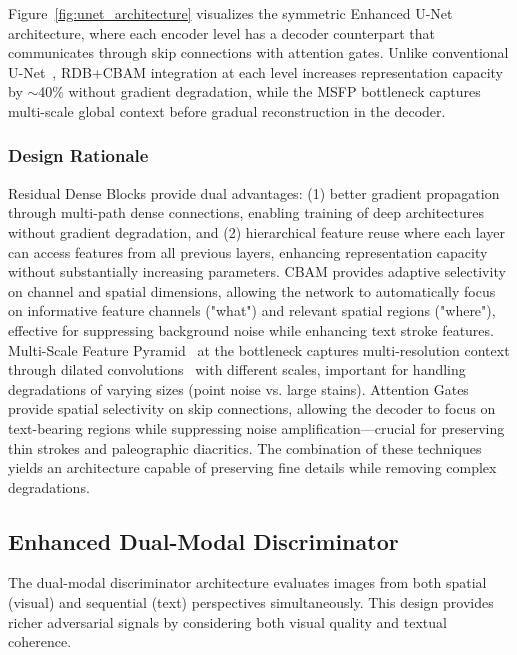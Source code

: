 \documentclass[journal]{IEEEtran}
\begin{document}
Figure~\ref{fig:unet_architecture} visualizes the symmetric Enhanced U-Net architecture, where each encoder level has a decoder counterpart that communicates through skip connections with attention gates. Unlike conventional U-Net~\cite{ronneberger2015unet}, RDB+CBAM integration at each level increases representation capacity by $\sim$40\% without gradient degradation, while the MSFP bottleneck captures multi-scale global context before gradual reconstruction in the decoder.

\subsubsection{Design Rationale}

Residual Dense Blocks provide dual advantages: (1) better gradient propagation through multi-path dense connections, enabling training of deep architectures without gradient degradation, and (2) hierarchical feature reuse where each layer can access features from all previous layers, enhancing representation capacity without substantially increasing parameters. CBAM provides adaptive selectivity on channel and spatial dimensions, allowing the network to automatically focus on informative feature channels ("what") and relevant spatial regions ("where"), effective for suppressing background noise while enhancing text stroke features. Multi-Scale Feature Pyramid~\cite{lin2017fpn} at the bottleneck captures multi-resolution context through dilated convolutions~\cite{chen2017deeplab} with different scales, important for handling degradations of varying sizes (point noise vs. large stains). Attention Gates~\cite{oktay2018attention} provide spatial selectivity on skip connections, allowing the decoder to focus on text-bearing regions while suppressing noise amplification—crucial for preserving thin strokes and paleographic diacritics. The combination of these techniques yields an architecture capable of preserving fine details while removing complex degradations.

\subsection{Enhanced Dual-Modal Discriminator}

The dual-modal discriminator architecture evaluates images from both spatial (visual) and sequential (text) perspectives simultaneously. This design provides richer adversarial signals by considering both visual quality and textual coherence.
\end{document}

